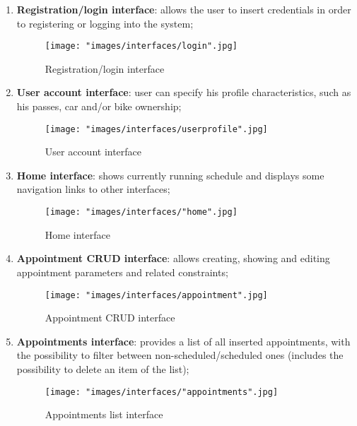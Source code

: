 \begin{enumerate}
\item \textbf{Registration/login interface}: allows the user to insert credentials in order to registering or logging into the system;
\begin{figure}[H]
\begin{center}
\texttt{[image: "images/interfaces/login".jpg]}
\caption{Registration/login interface}
\end{center}
\end{figure}
\item \textbf{User account interface}: user can specify his profile characteristics, such as his passes, car and/or bike ownership;
\begin{figure}[H]
\begin{center}
\texttt{[image: "images/interfaces/userprofile".jpg]}
\caption{User account interface}
\end{center}
\end{figure}
\item \textbf{Home interface}: shows currently running schedule and displays some navigation links to other interfaces;
\begin{figure}[H]
\begin{center}
\texttt{[image: "images/interfaces/"home".jpg]}
\caption{Home interface}
\end{center}
\end{figure}
\item \textbf{Appointment CRUD interface}: allows creating, showing and editing appointment parameters and related constraints;
\begin{figure}[H]
\begin{center}
\texttt{[image: "images/interfaces/appointment".jpg]}
\caption{Appointment CRUD interface}
\end{center}
\end{figure}
\item \textbf{Appointments interface}: provides a list of all inserted appointments, with the possibility to filter between non-scheduled/scheduled ones (includes the possibility to delete an item of the list);
\begin{figure}[H]
\begin{center}
\texttt{[image: "images/interfaces/"appointments".jpg]}
\caption{Appointments list interface}
\end{center}

\end{figure}
\end{enumerate}
